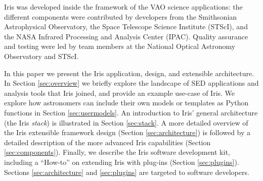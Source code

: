 \documentclass[preprint,authoryear,5p]{elsarticle}
\begin{document}

Iris was developed inside the framework of the VAO science applications: the
different components were contributed by developers from the Smithsonian
Astrophysical Observatory, the Space Telescope Science Institute (STScI), and the NASA
Infrared Processing and Analysis Center (IPAC). Quality assurance and testing were led
by team members at the National Optical Astronomy Observatory and STScI.


In this paper we present the Iris application, design, and extensible architecture. In Section
\ref{sec:overview} we briefly explore the landscape of SED applications and
analysis tools that Iris joined, and provide an example use-case of Iris. We
explore how astronomers can include their own models or templates as Python
functions in Section \ref{sec:usermodels}. An introduction to Iris' general
architecture (the Iris \emph{stack}) is illustrated in Section \ref{sec:stack}.
A more detailed overview of the Iris extensible framework design (Section
\ref{sec:architecture}) is followed by a detailed description of the more
advanced Iris capabilities (Section \ref{sec:components}). Finally, we
describe the Iris software development kit, including a ``How-to'' on extending
Iris with plug-ins (Section \ref{sec:plugins}). Sections \ref{sec:architecture} and 
\ref{sec:plugins} are targeted to software
developers.
\end{document}
